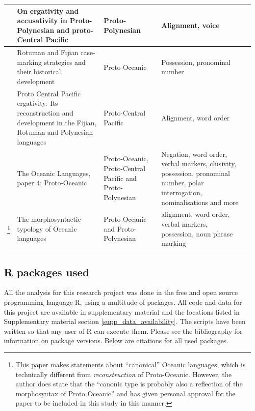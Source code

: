 \documentclass[12pt,letterpaper]{article}
\begin{document}
\begin{longtable}{|p{3cm}|  p{5cm}| p{4cm} | p{3cm}  | p{3cm} |}
\citet{ball2007ergativity} & On ergativity and accusativity in Proto-Polynesian and proto-Central Pacific&Proto-Polynesian & Alignment, voice \\ \hline

\citet{kikusawa2001rotuman} & Rotuman and Fijian case-marking strategies and their historical development  & Proto-Oceanic & Possession, pronominal number \\ \hline

\citet{kikusawa2002proto}  & Proto Central Pacific ergativity: Its reconstruction and development in the Fijian, Rotuman and Polynesian languages & Proto-Central Pacific   & Alignment, word order \\ \hline

\citet{lynchrosscrowley_proto_grammar_oceanic} & The Oceanic Languages, paper 4: Proto-Oceanic & Proto-Oceanic, Proto-Central Pacific and Proto-Polynesian & Negation, word order, verbal markers, clusivity, possession, pronominal number, polar interrogation, nominalisations and more \\ \hline

\citet{ross2004morphosyntactic}\footnote{This paper makes statements about ``canonical'' Oceanic languages, which is technically different from \emph{reconstruction} of Proto-Oceanic. However, the author does state that the ``canonic type is probably also a reflection of the morphosyntax of Proto Oceanic'' \citep[492]{ross2004morphosyntactic} and has given personal approval for the paper to be included in this study in this manner.}  & The morphosyntactic typology of Oceanic languages &  Proto-Oceanic and Proto-Polynesian  & alignment, word order, verbal markers, possession, noun phrase marking \\ \hline
\end{longtable}
\FloatBarrier


\subsection{R packages used}
\label{supp:r_packages}
All the analysis for this research project was done in the free and open source programming language R, using a multitude of packages. All code and data for this project are available in supplementary material and the locations listed in Supplementary material section \ref{supp_data_availability}. The scripts have been written so that any user of R can execute them. Please see the bibliography for information on package versions. Below are citations for all used packages.
\end{document}
